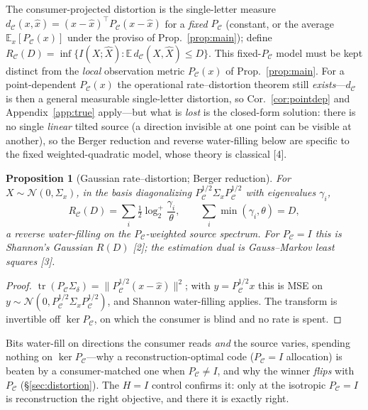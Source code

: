\documentclass[lettersize,onecolumn]{IEEEtran}
\newtheorem{proposition}{Proposition}
\theoremstyle{definition}
\theoremstyle{remark}
\newcommand{\PC}{P_{\mathcal{C}}}
\newcommand{\Sd}{\Sigma_{\delta}}
\newcommand{\tr}{\operatorname{tr}}
\newcommand{\E}{\mathbb{E}}
\begin{document}
The consumer-projected distortion is the single-letter measure
$d_{\mathcal{C}}(x,\hat x)=(x-\hat x)^\top\PC(x-\hat x)$ for a \emph{fixed} $\PC$
(constant, or the average $\E_x[\PC(x)]$ under the proviso of Prop.~\ref{prop:main});
define $R_{\mathcal{C}}(D)=\inf\{I(X;\hat X):\E\,d_{\mathcal{C}}(X,\hat X)\le D\}$.
This fixed-$\PC$ model must be kept distinct from the \emph{local} observation metric
$\PC(x)$ of Prop.~\ref{prop:main}. For a point-dependent $\PC(x)$ the operational
rate--distortion theorem still \emph{exists}---$d_{\mathcal{C}}$ is then a general
measurable single-letter distortion, so Cor.~\ref{cor:pointdep} and
Appendix~\ref{app:true} apply---but what is \emph{lost} is the closed-form solution:
there is no single \emph{linear} tilted source (a direction invisible at one point can
be visible at another), so the Berger reduction and reverse water-filling below are
specific to the fixed weighted-quadratic model, whose theory is classical
[4].

\begin{proposition}[Gaussian rate--distortion; Berger reduction]\label{prop:rd}
For $X\sim\mathcal{N}(0,\Sigma_x)$, in the basis diagonalizing
$\PC^{1/2}\Sigma_x\PC^{1/2}$ with eigenvalues $\gamma_i$,
\[
R_{\mathcal{C}}(D)=\sum_i \tfrac12\log_2^{+}\!\frac{\gamma_i}{\theta},\qquad
\sum_i\min(\gamma_i,\theta)=D,
\]
a reverse water-filling on the $\PC$-weighted source spectrum. For $\PC=I$ this is
Shannon's Gaussian $R(D)$ [2]; the estimation dual is Gauss--Markov
least squares [3].
\end{proposition}
\begin{proof}
$\tr(\PC\Sd)=\|\PC^{1/2}(x-\hat x)\|^2$; with $y=\PC^{1/2}x$ this is MSE on
$y\sim\mathcal{N}(0,\PC^{1/2}\Sigma_x\PC^{1/2})$, and Shannon water-filling applies.
The transform is invertible off $\ker\PC$, on which the consumer is blind and no rate
is spent.
\end{proof}

Bits water-fill on directions the consumer reads \emph{and} the source varies,
spending nothing on $\ker\PC$---why a reconstruction-optimal code ($\PC=I$
allocation) is beaten by a consumer-matched one when $\PC\ne I$, and why the winner
\emph{flips} with $\PC$ (\S\ref{sec:distortion}). The $H=I$ control confirms it: only
at the isotropic $\PC=I$ is reconstruction the right objective, and there it is
exactly right.
\end{document}
